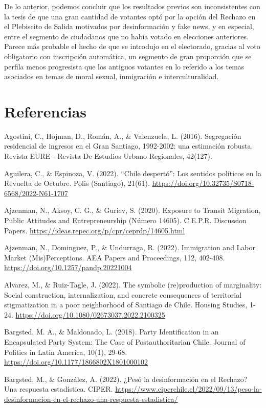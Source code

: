 \documentclass[
  12pt,
]{book}
\begin{document}
De lo anterior, podemos concluir que los resultados previos son inconsistentes con la tesis de que una gran cantidad de votantes optó por la opción del Rechazo en el Plebiscito de Salida motivados por desinformación y fake news, y en especial, entre el segmento de ciudadanos que no había votado en elecciones anteriores. Parece más probable el hecho de que se introdujo en el electorado, gracias al voto obligatorio con inscripción automática, un segmento de gran proporción que se perfila menos progresista que los antiguos votantes en lo referido a los temas asociados en temas de moral sexual, inmigración e interculturalidad.

\hypertarget{referencias}{%
\chapter*{Referencias}\label{referencias}}

Agostini, C., Hojman, D., Román, A., \& Valenzuela, L. (2016). Segregación residencial de ingresos en el Gran Santiago, 1992-2002: una estimación robusta. Revista EURE - Revista De Estudios Urbano Regionales, 42(127).

Aguilera, C., \& Espinoza, V. (2022). ``Chile despertó'': Los sentidos políticos en la Revuelta de Octubre. Polis (Santiago), 21(61). \url{https://doi.org/10.32735/S0718-6568/2022-N61-1707}

Ajzenman, N., Aksoy, C. G., \& Guriev, S. (2020). Exposure to Transit Migration, Public Attitudes and Entrepreneurship (Número 14605). C.E.P.R. Discussion Papers. \url{https://ideas.repec.org/p/cpr/ceprdp/14605.html}

Ajzenman, N., Dominguez, P., \& Undurraga, R. (2022). Immigration and Labor Market (Mis)Perceptions. AEA Papers and Proceedings, 112, 402-408. \url{https://doi.org/10.1257/pandp.20221004}

Alvarez, M., \& Ruiz-Tagle, J. (2022). The symbolic (re)production of marginality: Social construction, internalization, and concrete consequences of territorial stigmatization in a poor neighborhood of Santiago de Chile. Housing Studies, 1-24. \url{https://doi.org/10.1080/02673037.2022.2100325}

Bargsted, M. A., \& Maldonado, L. (2018). Party Identification in an Encapsulated Party System: The Case of Postauthoritarian Chile. Journal of Politics in Latin America, 10(1), 29-68. \url{https://doi.org/10.1177/1866802X1801000102}

Bargsted, M., \& González, A. (2022). ¿Pesó la desinformación en el Rechazo? Una respuesta estadística. CIPER. \url{https://www.ciperchile.cl/2022/09/13/peso-la-desinformacion-en-el-rechazo-una-respuesta-estadistica/}
\end{document}
